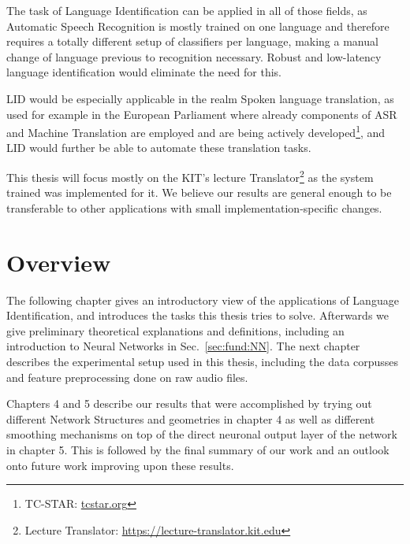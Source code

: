 The task of Language Identification can be applied in all of those fields, as Automatic Speech Recognition is mostly trained on one language and therefore requires a totally different setup of classifiers per language, making a manual change of language previous to recognition necessary. Robust and low-latency language identification would eliminate the need for this.

LID would be especially applicable in the realm Spoken language translation, as used for example in the European Parliament where already components of ASR and Machine Translation are employed and are being actively developed\footnote{TC-STAR: \url{tcstar.org}}\cite{vilar2005statistical}, and LID would further be able to automate these translation tasks.

This thesis will focus mostly on the KIT's lecture Translator\footnote{Lecture Translator: \url{https://lecture-translator.kit.edu}}  as the system trained was implemented for it. We believe our results are general enough to be transferable to other applications with small implementation-specific changes.

\section{Overview}
\label{sec:Intro:Overview}

The following chapter gives an introductory view of the applications of Language Identification, and introduces the tasks this thesis tries to solve. Afterwards we give preliminary theoretical explanations and definitions, including an introduction to Neural Networks in Sec.~\ref{sec:fund:NN}. The next chapter describes the experimental setup used in this thesis, including the data corpusses and feature preprocessing done on raw audio files. 

Chapters 4 and 5 describe our results that were accomplished by trying out different Network Structures and geometries in chapter 4 as well as different smoothing mechanisms on top of the direct neuronal output layer of the network in chapter 5. This is followed by the final summary of our work and an outlook onto future work improving upon these results.